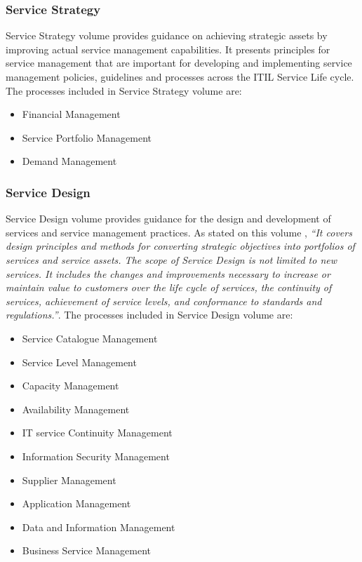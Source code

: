 \subsubsection{Service Strategy} 

Service Strategy volume provides guidance on achieving strategic assets by improving actual service management capabilities. It presents principles for service management that are important for developing and implementing service management policies, guidelines and processes across the ITIL Service Life cycle.\cite{itilSS} The processes included in Service Strategy volume are:

\begin{itemize}
  \item Financial Management
  \item Service Portfolio Management 
  \item Demand Management
\end{itemize}

\subsubsection{Service Design}

Service Design volume provides guidance for the design and development of services and service management practices. As stated on this volume \cite{itilSD}, \textit{``It covers design principles and methods for converting strategic objectives into portfolios of services and service assets. The scope of Service Design is not limited to new services. It includes the changes and improvements necessary to increase or maintain value to customers over the life cycle of services, the continuity of services, achievement of service levels, and conformance to standards and regulations.''}. The processes included in Service Design volume are:

\begin{itemize}
  \item Service Catalogue Management
  \item Service Level Management 
  \item Capacity Management
  \item Availability Management
  \item IT service Continuity Management
  \item Information Security Management 
  \item Supplier Management
  \item Application Management
  \item Data and Information Management
  \item Business Service Management
\end{itemize} 

